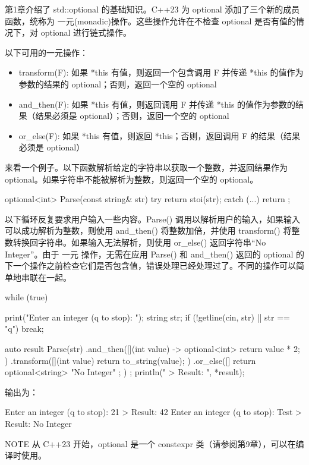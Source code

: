 

第1章介绍了 std::optional 的基础知识。C++23 为 optional 添加了三个新的成员函数，统称为 一元(monadic)操作。这些操作允许在不检查 optional 是否有值的情况下，对 optional 进行链式操作。

以下可用的一元操作：

\begin{itemize}
\item
transform(F): 如果 *this 有值，则返回一个包含调用 F 并传递 *this 的值作为参数的结果的 optional；否则，返回一个空的 optional

\item
and\_then(F): 如果 *this 有值，则返回调用 F 并传递 *this 的值作为参数的结果（结果必须是 optional）；否则，返回一个空的 optional

\item
or\_else(F): 如果 *this 有值，则返回 *this；否则，返回调用 F 的结果（结果必须是 optional）
\end{itemize}

来看一个例子。以下函数解析给定的字符串以获取一个整数，并返回结果作为 optional。如果字符串不能被解析为整数，则返回一个空的 optional。

\begin{cpp}
optional<int> Parse(const string& str)
{
    try { return stoi(str); }
    catch (...) { return {}; }
}
\end{cpp}

以下循环反复要求用户输入一些内容。Parse() 调用以解析用户的输入，如果输入可以成功解析为整数，则使用 and\_then() 将整数加倍，并使用 transform() 将整数转换回字符串。如果输入无法解析，则使用 or\_else() 返回字符串“No Integer”。由于 一元 操作，无需在应用 Parse() 和 and\_then() 返回的 optional 的下一个操作之前检查它们是否包含值，错误处理已经处理过了。不同的操作可以简单地串联在一起。

\begin{cpp}
while (true) {
    print("Enter an integer (q to stop): ");
    string str;
    if (!getline(cin, str) || str == "q") { break; }

    auto result { Parse(str)
        .and_then([](int value) -> optional<int> { return value * 2; })
        .transform([](int value) { return to_string(value); })
        .or_else([] { return optional<string> { "No Integer" }; }) };
    println(" > Result: {}", *result);
}
\end{cpp}

输出为：

\begin{shell}
Enter an integer (q to stop): 21
    > Result: 42
Enter an integer (q to stop): Test
    > Result: No Integer
\end{shell}

\begin{myNotic}{NOTE}
从 C++23 开始，optional 是一个 constexpr 类（请参阅第9章），可以在编译时使用。
\end{myNotic}


